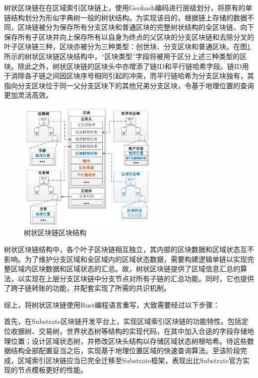 树状区块链在在区域索引区块链上，使用Geohash编码进行层级划分，将原有的单链结构划分为形似字典树一般的树状结构。为实现该目的，根据链上存储的数据不同，区块链被分为保存所有分支区块和普通区块的完整树状结构的全区块链、向下保存所有子区块并向上保存所有以自身为终点的父区块的分支区块链和去除分叉的叶子区块链三种，区块亦被分为三种类型：创世块、分支区块和普通区块。在图\ref{树状链区块结构示意图}所示的树状区块链区块结构中，“区块类型”字段将被用于区分上述三种类型的区块。除此之外，树状区块链的区块头中亦增添了链ID和平行链哈希字段。链ID用于消除各子链之间因区块序号相同引起的冲突，而平行链哈希为分支区块独有，其指向分支区块位于同一父分支区块下的其他兄弟分支区块，令基于地理位置的查询更加灵活高效。


\begin{figure}[htbp]
    \centering
    \includegraphics[width=0.6\textwidth]{images/树状区块链区块结构.png}
    \caption{树状区块链区块结构}\label{树状链区块结构示意图} %
\end{figure}

树状区块链结构中，各个叶子区块链相互独立，其内部的区块数据和区域状态互不影响。为了维护分支区域和全区域内的区域状态数据，需要构建逻辑单链以实现完整区域内区块数据和区域状态的汇总。故，树状区块链提供了区域信息汇总的算法，以实现在上层分支区块链中分支节点对所有子链的汇总功能。同时，它也提供了跨子链转账的功能，并配套实现了所需的共识机制。

综上，将树状区块链使用Rust编程语言重写，大致需要经过以下步骤：

首先，在Substrate区块链开发平台上，实现区域索引区块链的功能特性。包括定位收据树、交易树，世界状态树等结构的实现代码，在其中加入合适的字段存储地理位置；设计区域状态树，并修改区块头结构以存储区域状态树根哈希。待这些数据结构全部配置妥当之后，实现基于地理位置区域的快速查询算法。至该阶段完成，区域索引区块链应当已完全迁移至Substrate框架，表现出比Substrate官方实现的节点模板更好的性能。

